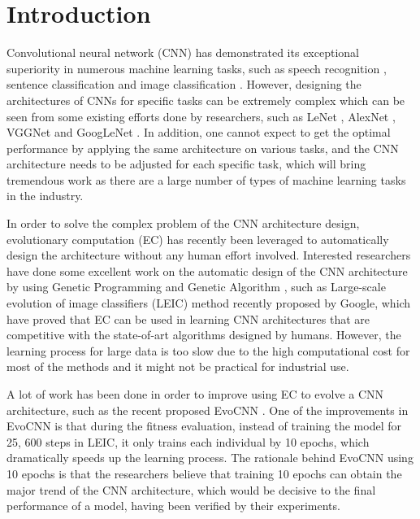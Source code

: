 \documentclass[conference]{IEEEtran}
\begin{document}
\section{Introduction}
Convolutional neural network (CNN) has demonstrated its exceptional superiority in numerous machine learning tasks, such as speech recognition \cite{CNNspeech:Ossama}, sentence classification \cite{CNNsentence:Yoon} and image classification \cite{ImageNet:Alex}. However, designing the architectures of CNNs for specific tasks can be extremely complex which can be seen from some existing efforts done by researchers, such as LeNet \cite{ZipcodeRecognition:LeCun}\cite{DocumentRecognition:LeCun}, AlexNet \cite{ImageNet:Alex}, VGGNet \cite{CNNverydeep:Simonyan} and GoogLeNet \cite{CNNdeeper:Szegedy}. %
In addition, one cannot expect to get the optimal performance by applying the same architecture on various tasks, and the CNN architecture needs to be adjusted for each specific task, which will bring tremendous work as there are a large number of types of machine learning tasks in the industry. 


In order to solve the complex problem of the CNN architecture design, evolutionary computation (EC) has recently been leveraged to automatically design the architecture without any human effort involved. Interested researchers have done some excellent work on the automatic design of the CNN architecture by using Genetic Programming \cite{CNNGP:Suganuma} and Genetic Algorithm \cite{CNNevolve:Stanley}, such as Large-scale evolution of image classifiers (LEIC) method \cite{LEIC:Real} recently proposed by Google, which have proved that EC can be used in learning CNN architectures that are competitive with the state-of-art algorithms designed by humans. However, the learning process for large data is too slow due to the high computational cost for most of the methods and it might not be practical for industrial use. 


A lot of work has been done in order to improve using EC to evolve a CNN architecture, such as the recent proposed EvoCNN \cite{EvolveCNN:Yanan}. One of the improvements in EvoCNN is that during the fitness evaluation, instead of training the model for 25, 600 steps in LEIC, it only trains each individual by 10 epochs, which dramatically speeds up the learning process. The rationale behind EvoCNN using 10 epochs is that the researchers believe that training 10 epochs can obtain the major trend of the CNN architecture, which would be decisive to the final performance of a model, having been verified by their experiments. 
\end{document}
